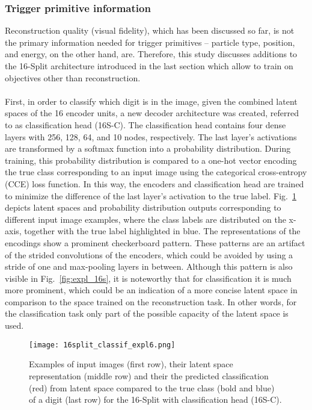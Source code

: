 \documentclass[../../main.tex]{subfiles}
\begin{document}
\subsubsection{Trigger primitive information}\label{sec:tp_inf}
Reconstruction quality (visual fidelity), which has been discussed so far, is not the primary information needed for trigger primitives -- particle type, position, and energy, on the other hand, are. Therefore, this study discusses additions to the 16-Split architecture introduced in the last section which allow to train on objectives other than reconstruction.\\
\\
First, in order to classify which digit is in the image, given the combined latent spaces of the 16 encoder units, a new decoder architecture was created, referred to as classification head (16S-C). The classification head contains four dense layers with 256, 128, 64, and 10 nodes, respectively. The last layer's activations are transformed by a softmax function into a probability distribution. During training, this probability distribution is compared to a one-hot vector encoding the true class corresponding to an input image using the categorical cross-entropy (CCE) loss function. In this way, the encoders and classification head are trained to minimize the difference of the last layer's activation to the true label. Fig.~\ref{fig:16s_class} depicts latent spaces and probability distribution outputs corresponding to different input image examples, where the class labels are distributed on the x-axis, together with the true label highlighted in blue. The representations of the encodings show a prominent checkerboard pattern. These patterns are an artifact of the strided convolutions of the encoders, which could be avoided by using a stride of one and max-pooling layers in between. Although this pattern is also visible in Fig.~\ref{fig:expl_16s}, it is noteworthy that for classification it is much more prominent, which could be an indication of a more concise latent space in comparison to the space trained on the reconstruction task. In other words, for the classification task only part of the possible capacity of the latent space is used.\\
\begin{figure}[htp]
			\begin{center}
				\texttt{[image: 16split\_classif\_expl6.png]}
				\caption{Examples of input images (first row), their latent space representation (middle row) and their the predicted classification (red) from latent space compared to the true class (bold and blue) of a digit (last row) for the 16-Split with classification head (16S-C).}
				\label{fig:16s_class}
			\end{center}
\end{figure}
\end{document}
